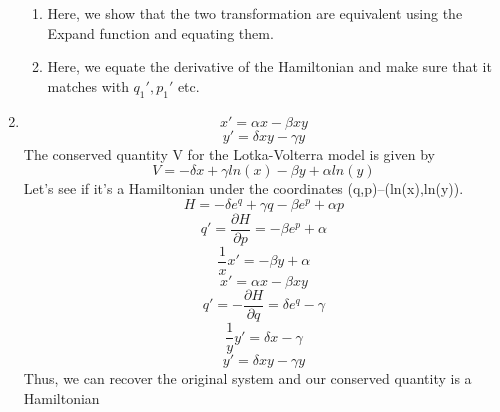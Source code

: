 \documentclass[a4paper,11pt]{article}
\begin{document}
\begin{enumerate}
\begin{enumerate}
		\item
		Here, we show that the two transformation are equivalent using the Expand function and equating them.
		\item
		Here, we equate the derivative of the Hamiltonian and make sure that it matches with $q_1', p_1'$ etc.
		
		
	\end{enumerate}	
	 
	\item 
	\[ x' = \alpha x - \beta xy \]
	\[ y' = \delta xy -\gamma y \]
	The conserved quantity V for the Lotka-Volterra model is given by
	\[V = -\delta x + \gamma ln(x)- \beta y + \alpha ln(y)\]
	Let's see if it's a Hamiltonian under the coordinates (q,p)--(ln(x),ln(y)).
	\[ H= -\delta e^q + \gamma q- \beta e^p + \alpha p\]
	\[ q' = \frac{\partial H}{\partial p}= - \beta e^p + \alpha \]
	\[ \frac{1}{x}x' = - \beta y + \alpha\]
	\[x' =  \alpha x - \beta x y\]
	\[ q' = -\frac{\partial H}{\partial q}= \delta e^q - \gamma \]
	\[ \frac{1}{y}y' = \delta x - \gamma\]
	\[ y' = \delta x y - \gamma y\]
	Thus, we can recover the original system and our conserved quantity is a Hamiltonian
	
	
	


	\end{enumerate} 
\end{document}
